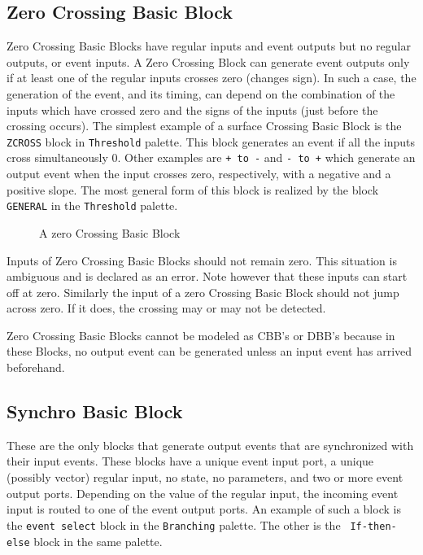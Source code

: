 \documentclass{book}
\newcommand{\logical}{{Synchro }}
\begin{document}
\subsection{Zero Crossing Basic Block} 
Zero Crossing Basic Blocks have
regular inputs and event outputs but no regular outputs, or event
inputs. A Zero Crossing Block can generate event outputs only if at least
one of the regular inputs crosses zero (changes sign). In such a case, the
generation of the event, and its timing, can depend on the combination of
the inputs which have crossed zero and the signs of the inputs (just
before the crossing occurs). The simplest example of a surface Crossing
Basic Block is the
{\tt ZCROSS} block in {\tt Threshold} palette. This block generates an 
event if all the inputs cross simultaneously 0. Other examples are
{\tt + to -} and {\tt - to +} which generate an output event when the
input crosses zero, respectively, with a negative and a positive
slope. The most general form of this block is realized by the block
{\tt GENERAL} in the {\tt Threshold} palette. 


\begin{figure}[ht]

\caption{A zero Crossing Basic Block}
\label{zbb}
\end{figure}


Inputs of Zero Crossing Basic Blocks should not remain zero. This
situation is ambiguous and is declared as an error. Note however that
these inputs can start off at zero. Similarly the input of a zero
Crossing Basic Block should not jump across zero. If it does, the
crossing may or may not be detected.

Zero Crossing Basic Blocks cannot be modeled as CBB's or DBB's
because in these Blocks, no output event can be generated
unless an input event has arrived beforehand.


\subsection{\logical Basic Block}
These are the only blocks that generate output events that are
synchronized with their input events. These blocks have a unique 
event input port, a unique (possibly vector) regular input, no state,
no parameters, and two or more event output ports. Depending on the
value of the regular input, the incoming event input is routed to one
of the event output ports. An example of such a block is the {\tt event
select} block in the {\tt Branching} palette. The other is the {\tt
If-then-else} block in the same palette.
\end{document}
